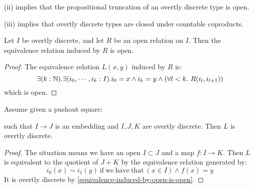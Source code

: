 \begin{remark}
(ii) implies that the propositional truncation of an overtly discrete type is open.

(iii) implies that overtly discrete types are closed under countable coproducts.
\end{remark}

\begin{lemma}\label{equivalence-induced-by-open-is-open}
Let $I$ be overtly discrete, and let $R$ be an open relation on $I$. Then the equivalence relation induced by $R$ is open.
\end{lemma}

\begin{proof}
The equivalence relation $L(x,y)$ induced by $R$ is:
\[\exists(k:\N). \exists(i_0,\cdots,i_k:I). i_0=x\land i_k=y \land (\forall l<k.\ R(i_l,i_{l+1})) \]
which is open.
\end{proof}

\begin{lemma}
Assume given a pushout square:
\begin{center}
\end{center}
such that $I\to J$ is an embedding and $I,J,K$ are overtly discrete. Then $L$ is overtly discrete.
\end{lemma}

\begin{proof}
The situation means we have an open $I\subset J$ and a map $f:I\to K$. Then $L$ is equivalent to the quotient of $J+K$ by the  equivalence relation generated by:
\[i_0(x) \sim i_1(y)\ \mathrm{if\ we\ have\ that}\ (x\in I)\land f(x) = y\]
It is overtly discrete by \cref{equivalence-induced-by-open-is-open}.
\end{proof}